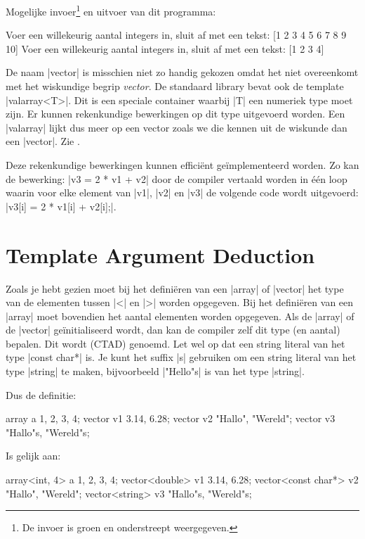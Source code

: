\begin{cpplstShortInline}
Mogelijke invoer\footnote{%
	De invoer is groen en onderstreept weergegeven.
} en uitvoer van dit programma:
\begin{coutput}
Voer een willekeurig aantal integers in, sluit af met een tekst:
[1 2 3 4 5 6 7 8 9 10]
Voer een willekeurig aantal integers in, sluit af met een tekst:
[1 2 3 4]
\end{coutput}

De naam |vector| is misschien niet zo handig gekozen omdat het niet overeenkomt met het wiskundige begrip \emph{vector}.
De standaard library bevat ook de template |valarray<T>|. 
Dit is een speciale container waarbij |T| een numeriek type moet zijn.
Er kunnen rekenkundige bewerkingen op dit type uitgevoerd worden.
Een |valarray| lijkt dus meer op een vector zoals we die kennen uit de wiskunde dan een |vector|.
Zie .

Deze rekenkundige bewerkingen kunnen efficiënt geïmplementeerd worden.
Zo kan de bewerking:
|v3 = 2 * v1 + v2| door de compiler vertaald worden in één loop waarin voor elke element van |v1|, |v2| en |v3| de volgende code wordt uitgevoerd: |v3[i] = 2 * v1[i] + v2[i];|.

\section{Template Argument Deduction}
Zoals je hebt gezien moet bij het definiëren van een |array| of |vector| het type van de elementen tussen |<| en |>| worden opgegeven.
Bij het definiëren van een |array| moet bovendien het aantal elementen worden opgegeven.
Als de |array| of de |vector| geïnitialiseerd wordt, dan kan de compiler zelf dit type (en aantal) bepalen.
Dit wordt  (CTAD) genoemd.
Let wel op dat een string literal van het type |const char*| is.
Je kunt het suffix |s| gebruiken om een string literal van het type |string| te maken, bijvoorbeeld |"Hello"s| is van het type |string|.

Dus de definitie:
\begin{cpplstfragment}
	array a {1, 2, 3, 4};
	vector v1 {3.14, 6.28};
	vector v2 {"Hallo", "Wereld"};
	vector v3 {"Hallo"s, "Wereld"s};
\end{cpplstfragment}

Is gelijk aan:
\begin{cpplstfragment}
	array<int, 4> a {1, 2, 3, 4};
	vector<double> v1 {3.14, 6.28};
	vector<const char*> v2 {"Hallo", "Wereld"};
	vector<string> v3 {"Hallo"s, "Wereld"s};
\end{cpplstfragment}


\end{cpplstShortInline}
